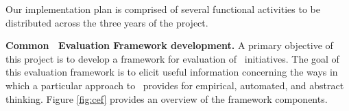 
Our implementation plan is comprised of several functional activities to be
distributed across the three years of the project.

{\bf Common \eCT\ Evaluation Framework development.}  A primary objective
of this project is to develop a framework for evaluation of \eCT\
initiatives.  The goal of this evaluation framework is to elicit useful
information concerning the ways in which a particular approach to \eCT\
provides for empirical, automated, and abstract thinking. Figure
\ref{fig:cef} provides an overview of the framework components.


